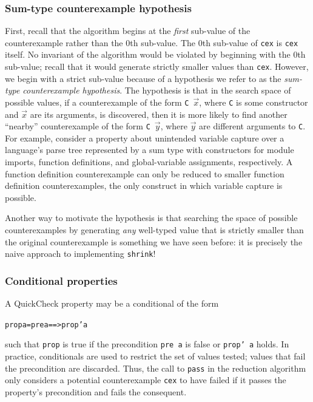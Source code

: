 \documentclass[10pt]{sigplanconf}
\newenvironment{code}{\begin{alltt}}{\end{alltt}}
\newcommand{\ttp}[1]{\texttt{#1}}
\begin{document}
\subsubsection{Sum-type counterexample hypothesis}
First, recall that the algorithm begins at the \emph{first} sub-value of the
counterexample rather than the 0th sub-value.  The 0th sub-value of \ttp{cex} is
\ttp{cex} itself.  No invariant of the algorithm would be violated by beginning
with the 0th sub-value; recall that it would generate strictly smaller values
than \ttp{cex}.  However, we begin with a strict sub-value because of a
hypothesis we refer to as the \emph{sum-type counterexample hypothesis}.  The
hypothesis is that in the search space of possible values, if a counterexample
of the form \ttp{C}~$\vec{x}$, where \ttp{C} is some constructor and $\vec{x}$
are its arguments, is discovered, then it is more likely to find another
``nearby'' counterexample of the form \ttp{C}~$\vec{y}$, where $\vec{y}$ are
different arguments to \ttp{C}.  For example, consider a property about
unintended variable capture over a language's parse tree represented by a sum
type with constructors for module imports, function definitions, and
global-variable assignments, respectively.  A function definition counterexample
can only be reduced to smaller function definition counterexamples, the only
construct in which variable capture is possible.

Another way to motivate the hypothesis is that searching the space of possible
counterexamples by generating \emph{any} well-typed value that is strictly
smaller than the original counterexample is something we have seen before: it is
precisely the naive approach to implementing \ttp{shrink}!

\subsubsection{Conditional properties}
A QuickCheck property may be a conditional of the form
%
\begin{code}
prop a = pre a ==> prop' a
\end{code}
%
\noindent
such that \ttp{prop} is true if the precondition \ttp{pre a} is false or
\ttp{prop' a} holds.  In practice, conditionals are used to restrict the set of
values tested; values that fail the precondition are discarded.  Thus, the call
to \ttp{pass} in the reduction algorithm only considers a potential
counterexample \ttp{cex} to have failed if it passes the property's
precondition and fails the consequent.
\end{document}
